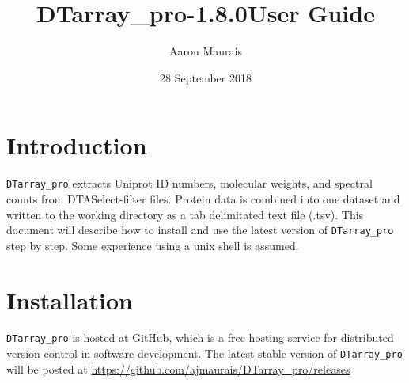 \documentclass[12pt]{article}
\newcommand{\VERSION}{1.8.0}
\begin{document}
	
	\title{DTarray\_pro-\VERSION \space User Guide}
	\author{Aaron Maurais}
	\date{28 September 2018}
	
	\maketitle
	\tableofcontents
	\newpage
	
	
	\section{Introduction}
	
	\texttt{DTarray\_pro} extracts Uniprot ID numbers, molecular weights, and spectral counts from DTASelect-filter files. Protein data is combined into one dataset and written to the working directory as a tab delimitated text file (.tsv). This document will describe how to install and use the latest version of \texttt{DTarray\_pro} step by step. Some experience using a unix shell is assumed.  
	
	
	\section{Installation}
	
	\texttt{DTarray\_pro} is hosted at GitHub, which is a free hosting service for distributed version control in software development.  
	The latest stable version of \texttt{DTarray\_pro} will be posted at \url{https://github.com/ajmaurais/DTarray_pro/releases}
	
\end{document}
